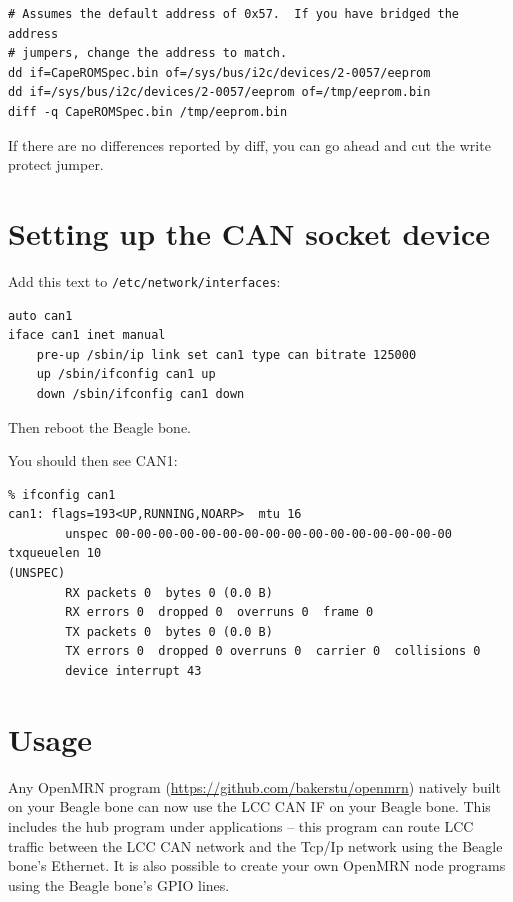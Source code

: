 \documentclass[12pt,twoside]{article}
\begin{document}
\begin{verbatim}
# Assumes the default address of 0x57.  If you have bridged the address 
# jumpers, change the address to match.
dd if=CapeROMSpec.bin of=/sys/bus/i2c/devices/2-0057/eeprom
dd if=/sys/bus/i2c/devices/2-0057/eeprom of=/tmp/eeprom.bin
diff -q CapeROMSpec.bin /tmp/eeprom.bin
\end{verbatim}

If there are no differences reported by diff, you can go ahead and cut the 
write protect jumper.

\section{Setting up the CAN socket device}

Add this text to \texttt{/etc/network/interfaces}:

\begin{verbatim}
auto can1
iface can1 inet manual
    pre-up /sbin/ip link set can1 type can bitrate 125000
    up /sbin/ifconfig can1 up
    down /sbin/ifconfig can1 down
\end{verbatim}

Then reboot the Beagle bone.

You should then see CAN1:

\begin{verbatim}
% ifconfig can1
can1: flags=193<UP,RUNNING,NOARP>  mtu 16
        unspec 00-00-00-00-00-00-00-00-00-00-00-00-00-00-00-00  txqueuelen 10  
(UNSPEC)
        RX packets 0  bytes 0 (0.0 B)
        RX errors 0  dropped 0  overruns 0  frame 0
        TX packets 0  bytes 0 (0.0 B)
        TX errors 0  dropped 0 overruns 0  carrier 0  collisions 0
        device interrupt 43  
\end{verbatim}

\section{Usage}

Any OpenMRN program (\url{https://github.com/bakerstu/openmrn}) natively built
on your Beagle bone can now use the LCC CAN IF on your Beagle bone. This
includes the hub program under applications -- this program can route LCC
traffic between the LCC CAN network and the Tcp/Ip network using the Beagle
bone's Ethernet. It is also possible to create your own OpenMRN node programs
using the Beagle bone's GPIO lines.
\end{document}
